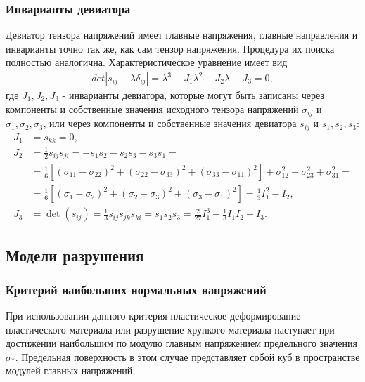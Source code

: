 \subsubsection{Инварианты девиатора}

Девиатор тензора напряжений имеет главные напряжения, главные направления и инварианты точно так же, как сам тензор напряжения. Процедура их поиска полностью аналогична. Характеристическое уравнение имеет вид
\begin{align}
det|s_{ij}- \lambda\delta_{ij}| = \lambda^3-J_1\lambda^2-J_2\lambda-J_3=0,
\end{align}
где $J_1, J_2, J_3$ - инварианты девиатора, которые могут быть записаны через компоненты и собственные значения исходного тензора напряжений $\sigma_{ij}$ и $\sigma_1, \sigma_2, \sigma_3$, или через компоненты и собственные значения девиатора $s_{ij}$ и $s_1, s_2, s_3$:
\begin{align}
J_1 &= s_{kk}=0, \nonumber\\ 
J_2 &= \frac{1}{2}s_{ij}s_{ji} = -s_1s_2 - s_2s_3 - s_3s_1 = \nonumber\\ 
 &= \tfrac{1}{6}\left[(\sigma_{11} - \sigma_{22})^2 + (\sigma_{22} - \sigma_{33})^2 + (\sigma_{33} - \sigma_{11})^2 \right ] + \sigma_{12}^2 + \sigma_{23}^2 + \sigma_{31}^2 = \nonumber\\ 
 &= \tfrac{1}{6}\left[(\sigma_1 - \sigma_2)^2 + (\sigma_2 - \sigma_3)^2 + (\sigma_3 - \sigma_1)^2 \right ] = \tfrac{1}{3}I_1^2-I_2, \nonumber\\ 
J_3 &= \det(s_{ij}) = \tfrac{1}{3}s_{ij}s_{jk}s_{ki} = s_1s_2s_3 = \tfrac{2}{27}I_1^3 - \tfrac{1}{3}I_1 I_2 + I_3.
\end{align}

\clearpage
\newpage


\subsection{Модели разрушения}
\label{sec:destruction_models}

\subsubsection{Критерий наибольших нормальных напряжений}

При использовании данного критерия пластическое деформирование пластического материала или разрушение хрупкого материала наступает при достижении наибольшим по модулю главным напряжением предельного значения $\sigma_*$. Предельная поверхность в этом случае представляет собой куб в пространстве модулей главных напряжений.

